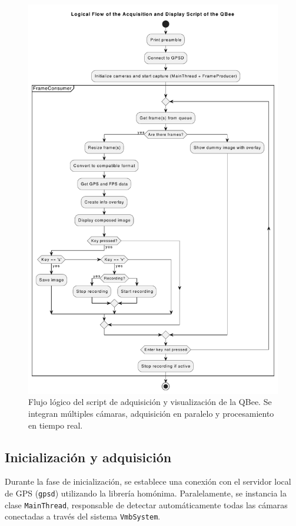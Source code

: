   \begin{figure}[!h]
      \centering
      \includegraphics[trim = 0 0 0 1cm, clip, width=1\textwidth]{Figures/C4/OSU_main.pdf}
      \caption{Flujo lógico del script de adquisición y visualización de la QBee. Se integran múltiples cámaras, adquisición en paralelo y procesamiento en tiempo real.}
      \label{fig:diagrama_script}
  \end{figure}
  
  \subsection{Inicialización y adquisición}
  
  Durante la fase de inicialización, se establece una conexión con el servidor local de GPS (\texttt{gpsd}) utilizando la librería homónima. Paralelamente, se instancia la clase \texttt{MainThread}, responsable de detectar automáticamente todas las cámaras conectadas a través del sistema \texttt{VmbSystem}.\\
  
